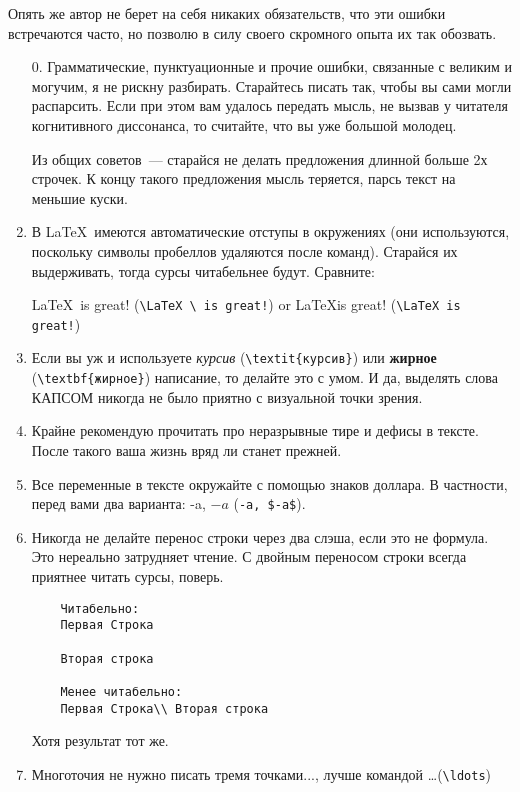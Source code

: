 Опять же автор не берет на себя никаких обязательств, что эти ошибки встречаются часто, но позволю в силу своего скромного опыта их так обозвать.
\begin{enumerate}
	\item[0.] Грамматические, пунктуационные и прочие ошибки, связанные с великим и могучим, я не рискну разбирать. 
	Старайтесь писать так, чтобы вы сами могли распарсить. 
	Если при этом вам удалось передать мысль, не вызвав у читателя когнитивного диссонанса, то считайте, что вы уже большой молодец.
	
	Из общих советов~--- старайся не делать предложения длинной больше 2х строчек. К концу такого предложения мысль теряется, парсь текст на меньшие куски.
	
	\item В \LaTeX \ имеются автоматические отступы в окружениях (они используются, поскольку символы пробеллов удаляются после команд). 
	Старайся их выдерживать, тогда сурсы читабельнее будут. Сравните:
	
	\LaTeX \ is great! (\verb|\LaTeX \ is great!|) or \LaTeX is great! (\verb|\LaTeX is great!|)
	
	\item Если вы уж и используете \textit{курсив} (\verb|\textit{курсив}|) или \textbf{жирное} (\verb|\textbf{жирное}|) написание, то делайте это с умом. 
	И да, выделять слова КАПСОМ никогда не было приятно с визуальной точки зрения.
	\item Крайне рекомендую прочитать про неразрывные тире и дефисы в тексте. 
	После такого ваша жизнь вряд ли станет прежней.
	
	\item Все переменные в тексте окружайте с помощью знаков доллара. В частности, перед вами два варианта: -a, $-a$ (\verb|-a, $-a$|).
	
	\item Никогда не делайте перенос строки через два слэша, если это не формула. 
	Это нереально затрудняет чтение. С двойным переносом строки всегда приятнее читать сурсы, поверь.
	\begin{verbatim}
	Читабельно:
	Первая Строка
	
	Вторая строка
	
	Менее читабельно:
	Первая Строка\\ Вторая строка
	\end{verbatim}  
	Хотя результат тот же.
	
	\item Многоточия не нужно писать тремя точками..., лучше командой \ldots (\verb|\ldots|)
	

\end{enumerate}
